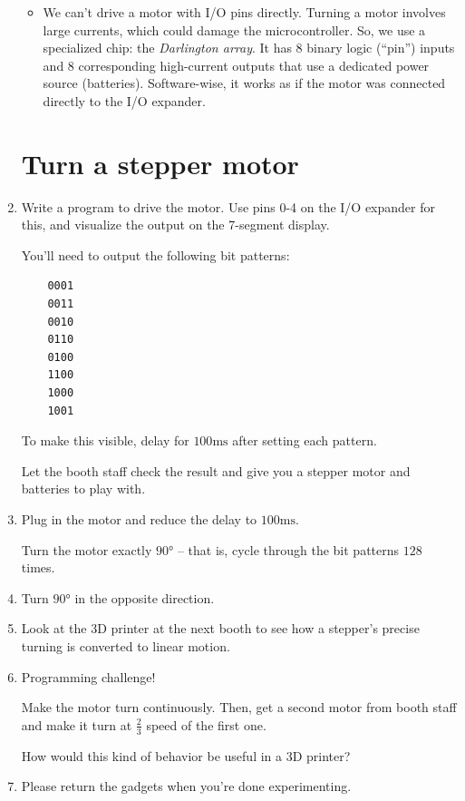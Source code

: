 \documentclass{../tutorial}
\begin{document}
\begin{enumerate}
\begin{itemize}
    \item
    We can't drive a motor with I/O pins directly.
    Turning a motor involves large currents, which could damage the
    microcontroller.
    So, we use a specialized chip: the  \emph{Darlington array}.
    It has 8 binary logic (“pin”) inputs and 8 corresponding high-current
    outputs that use a dedicated power source (batteries).
    Software-wise, it works as if the motor was connected directly to
    the I/O expander.
    \end{itemize}

\section{Turn a stepper motor}

\item
    Write a program to drive the motor.
    Use pins 0-4 on the I/O expander for this, and visualize the output
    on the 7-segment display.

    You'll need to output the following bit patterns:

    \begin{lstlisting}
    0001
    0011
    0010
    0110
    0100
    1100
    1000
    1001
    \end{lstlisting}

    To make this visible, delay for $100 \si{\milli\second}$ after setting each
    pattern.

    Let the booth staff check the result and give you a stepper motor and
    batteries to play with.

\item
    Plug in the motor and reduce the delay to $100 \si{\milli\second}$.

    Turn the motor exactly $90 \si{\degree}$ – that is, cycle through the bit
    patterns $128$ times.

\item
    Turn $90 \si{\degree}$ in the opposite direction.

\item
    Look at the 3D printer at the next booth to see how a stepper's precise
    turning is converted to linear motion.

\item
    Programming challenge!

    Make the motor turn continuously.
    Then, get a second motor from booth staff and make it turn at $\frac23$
    speed of the first one.

    How would this kind of behavior be useful in a 3D printer?

\item
     Please return the gadgets when you're done experimenting.

\end{enumerate}
\end{document}
